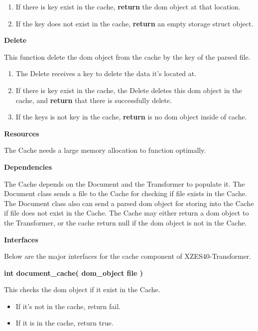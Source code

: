 \begin{enumerate}
    \item If there is key exist in the cache, \textbf{return} the \gls{dom} object at that location.
    \item If the key does not exist in the cache, \textbf{return} an empty storage struct object.
\end{enumerate}

\textbf{Delete}

This function delete the \gls{dom} object from the cache by the key of the parsed file.

\begin{enumerate}
    \item The Delete receives a key to delete the data it's located at.
    \item If there is key exist in the cache, the Delete deletes this \gls{dom} object in the cache, and \textbf{return} that there is successfully delete.
    \item If the keys is not key in the cache, \textbf{return} is no \gls{dom} object inside of cache.
\end{enumerate}

\textbf{Resources}

The Cache needs a large memory allocation to function optimally.

\textbf{Dependencies}

The Cache depends on the Document and the Transformer to populate it.
The Document class sends a file to the Cache for checking if file exists in the Cache.
The Document class also can send a parsed \gls{dom} object for storing into the Cache if file does not exist in the Cache.
The Cache may either return a \gls{dom} object to the Transformer, or the cache return null if the \gls{dom} object is not in the Cache.

\textbf{Interfaces}

Below are the major interfaces for the cache component of XZES40-Transformer.

\textbf{int document\_cache( dom\_object file )} 

This checks the \gls{dom} object if it exist in the Cache.

\begin{itemize}
    \item If it's not in the cache, return fail. 
    \item If it is in the cache, return true.
\end{itemize}

